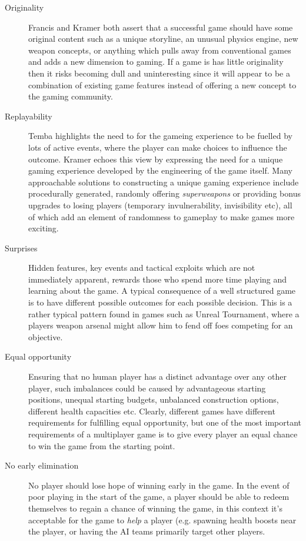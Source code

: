 \begin{description}

\item[Originality] Francis and Kramer both assert that a successful game should have some original content such as a unique storyline, an unusual physics engine, new weapon concepts, or anything which pulls away from conventional games and adds a new dimension to gaming. If a game is has little originality then it risks becoming dull and uninteresting since it will appear to be a combination of existing game features instead of offering a new concept to the gaming community.\cite{tomfrancis} \cite{wolfgangkramer} 

\item[Replayability] Temba highlights the need to for the gameing experience to be fuelled by lots of active events, where the player can make choices to influence the outcome. Kramer echoes this view by expressing the need for a unique gaming experience developed by the engineering of the game itself. \cite{antontemba} \cite{wolfgangkramer} Many approachable solutions to constructing a unique gaming experience include procedurally generated, randomly offering \emph{superweapons} or providing bonus upgrades to losing players (temporary invulnerability, invisibility etc), all of which add an element of randomness to gameplay to make games more exciting.
\item[Surprises] Hidden features, key events and tactical exploits which are not immediately apparent, rewards those who spend more time playing and learning about the game. A typical consequence of a well structured game is to have different possible outcomes for each possible decision. This is a rather typical pattern found in games such as Unreal Tournament, where a players weapon arsenal might allow him to fend off foes competing for an objective.

\item[Equal opportunity]
Ensuring that no human player has a distinct advantage over any other player, such imbalances could be caused by advantageous starting positions, unequal starting budgets, unbalanced construction options, different health capacities etc. Clearly, different games have different requirements for fulfilling equal opportunity, but one of the most important requirements of a multiplayer game is to give every player an equal chance to win the game from the starting point.

\item[No early elimination]
No player should lose hope of winning early in the game. In the event of poor playing in the start of the game, a player should be able to redeem themselves to regain a chance of winning the game, in this context it's acceptable for the game to \emph{help} a player (e.g. spawning health boosts near the player, or having the AI teams primarily target other players.


\end{description}
